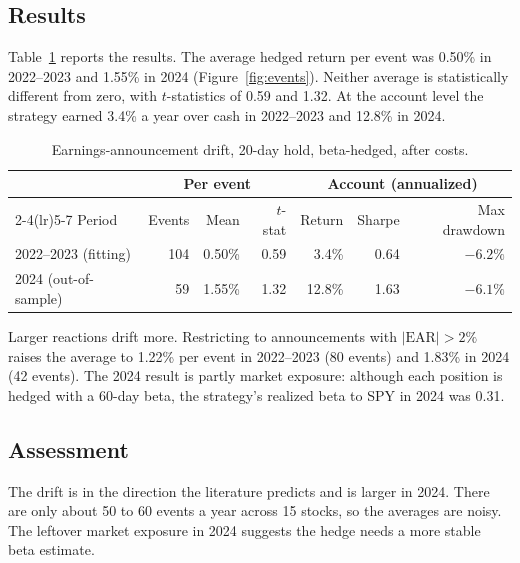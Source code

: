 \documentclass[../main.tex]{subfiles}
\begin{document}
\subsection{Results}
Table~\ref{tab:drift} reports the results. The average hedged return per event was 0.50\% in 2022--2023 and 1.55\% in 2024 (Figure~\ref{fig:events}). Neither average is statistically different from zero, with $t$-statistics of 0.59 and 1.32. At the account level the strategy earned 3.4\% a year over cash in 2022--2023 and 12.8\% in 2024.

\begin{table}[ht]\centering\small
\caption{Earnings-announcement drift, 20-day hold, beta-hedged, after costs.}\label{tab:drift}
\begin{tabular}{lrrrrrr}
\toprule
 & \multicolumn{3}{c}{Per event} & \multicolumn{3}{c}{Account (annualized)} \\
\cmidrule(lr){2-4}\cmidrule(lr){5-7}
Period & Events & Mean & $t$-stat & Return & Sharpe & Max drawdown \\
\midrule
2022--2023 (fitting) & 104 & 0.50\% & 0.59 & 3.4\% & 0.64 & $-6.2\%$ \\
2024 (out-of-sample) & 59 & 1.55\% & 1.32 & 12.8\% & 1.63 & $-6.1\%$ \\
\bottomrule
\end{tabular}
\end{table}

Larger reactions drift more. Restricting to announcements with $|\text{EAR}| > 2\%$ raises the average to 1.22\% per event in 2022--2023 (80 events) and 1.83\% in 2024 (42 events). The 2024 result is partly market exposure: although each position is hedged with a 60-day beta, the strategy's realized beta to SPY in 2024 was 0.31.


\subsection{Assessment}
The drift is in the direction the literature predicts and is larger in 2024. There are only about 50 to 60 events a year across 15 stocks, so the averages are noisy. The leftover market exposure in 2024 suggests the hedge needs a more stable beta estimate.

\ifSubfilesClassLoaded{}{}
\end{document}
